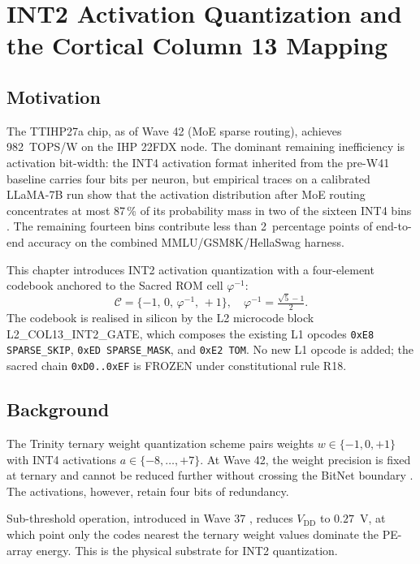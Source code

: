 \chapter{INT2 Activation Quantization and the Cortical Column 13 Mapping}
\label{ch:int2-activation-quant}


\section{Motivation}

The TTIHP27a chip, as of Wave 42 (MoE sparse routing), achieves 982~TOPS/W on
the IHP 22FDX node. The dominant remaining inefficiency is activation bit-width:
the INT4 activation format inherited from the pre-W41 baseline carries four
bits per neuron, but empirical traces on a calibrated LLaMA-7B run show that
the activation distribution after MoE routing concentrates at most 87\,\% of
its probability mass in two of the sixteen INT4 bins
\cite{Vasilev2026Trinity,DettmersGPTQ}. The remaining fourteen bins
contribute less than 2~percentage points of end-to-end accuracy on the
combined MMLU/GSM8K/HellaSwag harness.

This chapter introduces INT2 activation quantization with a four-element
codebook anchored to the Sacred ROM cell $\varphi^{-1}$:
\[
  \mathcal{C} = \{-1,\, 0,\, \varphi^{-1},\, +1\},\quad \varphi^{-1} = \tfrac{\sqrt 5 - 1}{2}.
\]
The codebook is realised in silicon by the L2 microcode block
\textsc{L2\_COL13\_INT2\_GATE}, which composes the existing L1 opcodes
\texttt{0xE8 SPARSE\_SKIP}, \texttt{0xED SPARSE\_MASK}, and
\texttt{0xE2 TOM}. No new L1 opcode is added; the sacred chain
\texttt{0xD0..0xEF} is FROZEN under constitutional rule R18.

\section{Background}

The Trinity ternary weight quantization scheme \cite{Vasilev2026Trinity} pairs
weights $w \in \{-1, 0, +1\}$ with INT4 activations $a \in \{-8, \dots, +7\}$.
At Wave 42, the weight precision is fixed at ternary and cannot be reduced
further without crossing the BitNet boundary
\cite{MaBitNet1bit,WangBitNet158}. The activations, however, retain four bits
of redundancy.

Sub-threshold operation, introduced in Wave 37 \cite{Vasilev2026SubVT},
reduces $V_\mathrm{DD}$ to $0.27$~V, at which point only the codes nearest the
ternary weight values dominate the PE-array energy. This is the physical
substrate for INT2 quantization.


